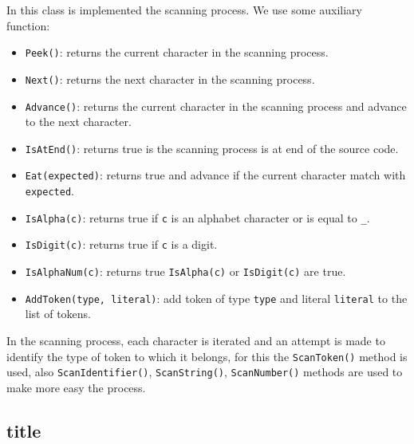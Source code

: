 \documentclass[a4paper, 12pt]{report}
\begin{document}
In this class is implemented the scanning process. We use some auxiliary function:

\begin{itemize}
  \item {\tt Peek()}: returns the current character in the scanning process.
  \item {\tt Next()}: returns the next character in the scanning process.
  \item {\tt Advance()}: returns the current character in the scanning process and advance to the next character.
  \item {\tt IsAtEnd()}: returns true is the scanning process is at end of the source code.
  \item {\tt Eat(expected)}: returns true and advance if the current character match with {\tt expected}.  
  \item {\tt IsAlpha(c)}: returns true if {\tt c} is an alphabet character or is equal to {\tt \_}.
  \item {\tt IsDigit(c)}: returns true if {\tt c} is a digit.
  \item {\tt IsAlphaNum(c)}: returns true {\tt IsAlpha(c)} or {\tt IsDigit(c)} are true.
  \item {\tt AddToken(type, literal)}: add token of type {\tt type} and literal {\tt literal} to the list of tokens.
\end{itemize}

In the scanning process, each character is iterated and an attempt is made to identify the type of token to which it belongs, for
this the {\tt ScanToken()} method is used, also {\tt ScanIdentifier()}, {\tt ScanString()}, {\tt ScanNumber()} methods are used
to make more easy the process.

\subsection*{title}
\end{document}
